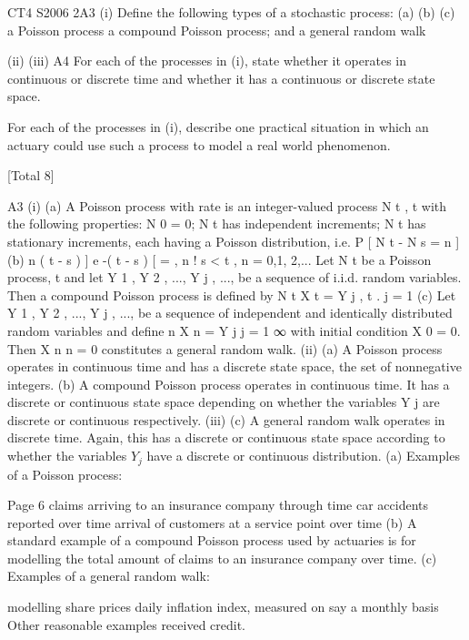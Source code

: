 \documentclass[a4paper,12pt]{article}
\begin{document}
CT4 S2006
2A3
(i)
Define the following types of a stochastic process:
(a)
(b)
(c)
a Poisson process
a compound Poisson process; and
a general random walk

(ii)
(iii)
A4
For each of the processes in (i), state whether it operates in continuous or
discrete time and whether it has a continuous or discrete state space.

For each of the processes in (i), describe one practical situation in which an
actuary could use such a process to model a real world phenomenon.

[Total 8]


A3
(i)
(a)
A Poisson process with rate \lambda  is an integer-valued process N t , t
 with the following properties:
N 0 = 0;
N t has independent increments;
N t has stationary increments, each having a Poisson distribution, i.e.
P [ N t - N s = n ]
(b)
n
\lambda  ( t - s ) ] e -\lambda  ( t - s )
[
=
,
n !
s < t , n = 0,1, 2,...
Let N t be a Poisson process, t  and let Y 1 , Y 2 , ..., Y j , ..., be a
sequence of i.i.d. random variables. Then a compound Poisson process
is defined by
N t
X t = \sum  Y j ,
t .
j = 1
(c)
Let Y 1 , Y 2 , ..., Y j , ..., be a sequence of independent and identically
distributed random variables and define
n
X n = \sum  Y j
j = 1
∞
with initial condition X 0 = 0. Then { X n } n = 0 constitutes a general
random walk.
(ii)
(a) A Poisson process operates in continuous time and has a discrete state space, the set of nonnegative integers.
(b) A compound Poisson process operates in continuous time.
It has a discrete or continuous state space depending on whether the variables Y j are discrete or continuous respectively.
(iii)
(c) A general random walk operates in discrete time. Again, this has a discrete or continuous state space according to whether the variables $Y_j$ have a discrete or continuous distribution.
(a) Examples of a Poisson process:
\item 
\item 
\item 
Page 6
claims arriving to an insurance company through time car accidents reported over time arrival of customers at a service point over time
(b) A standard example of a compound Poisson process used by actuaries is for modelling the total amount of claims to an insurance company over time.
(c) Examples of a general random walk:
\item 
\item 
modelling share prices daily
inflation index, measured on say a monthly basis
Other reasonable examples received credit.
\end{document}
